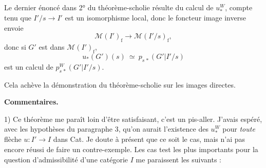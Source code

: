 \documentclass[11pt]{article}
\newcommand{\printedpage}[1]{\marginpar{\footnotesize p.~#1}}
\newcommand{\msp}[1]{\marginpar{\footnotesize [#1]}}
\newcommand{\rf}{\mathrm{f}}
\newcommand{\M}{\mathcal{M}}
\begin{document}
\printedpage{40}

\msp{page 72}

Le dernier énoncé dans 2° du théorème-scholie résulte du calcul de $u_*^W$, compte tenu que $I'/s \longrightarrow I'$ est un isomorphisme local, donc le foncteur image inverse envoie
\[
\M(I')_{\rf} \longrightarrow \M(I'/s)_{\rf},
\]
donc si $G'$ est dans $\M(I')_{\rf}$,
\[
u_*(G')(s) \ \simeq\ p_{s\,*}(G'|I'/s)
\]
est un calcul de $p^W_{s\,*}(G'|I'/s)$.

Cela achève la démonstration du théorème-scholie sur les images directes.

\textbf{Commentaires.}

1) Ce théorème me paraît loin d'être satisfaisant, c'est un pis-aller. J'avais espéré, avec les hypothèses du paragraphe 3, qu'on aurait l'existence des $u_*^W$ pour \textit{toute} flèche $u : I' \longrightarrow I$ dans Cat. Je doute à présent que ce soit le cas, mais n'ai pas encore réussi de faire un contre-exemple. Les cas test les plus importants pour la question d'admissibilité d'une catégorie $I$ me paraissent les suivants :
\end{document}
